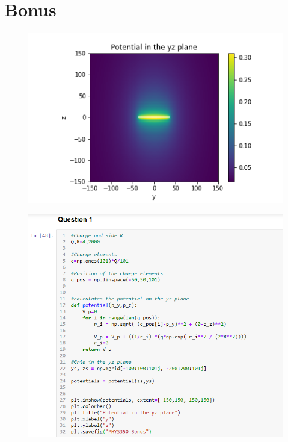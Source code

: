 \documentclass[
	12pt,
	]{article}
\theoremstyle{definition}
\theoremstyle{definition}
\theoremstyle{definition}
\theoremstyle{definition}
\theoremstyle{definition}
\theoremstyle{example}
\theoremstyle{note}
\theoremstyle{remark}
\theoremstyle{example}
\begin{document}
			\section*{Bonus }
			\begin{figure}[H]
				\centering
				\includegraphics[width=0.8\linewidth]{PHYS350_bonus.png}
			\end{figure}
				\begin{figure}[H]
					\centering
					\includegraphics[width=1.0\linewidth,height=1.0\linewidth]{PHYS350_1.png}
				\end{figure}
	
\end{document}
